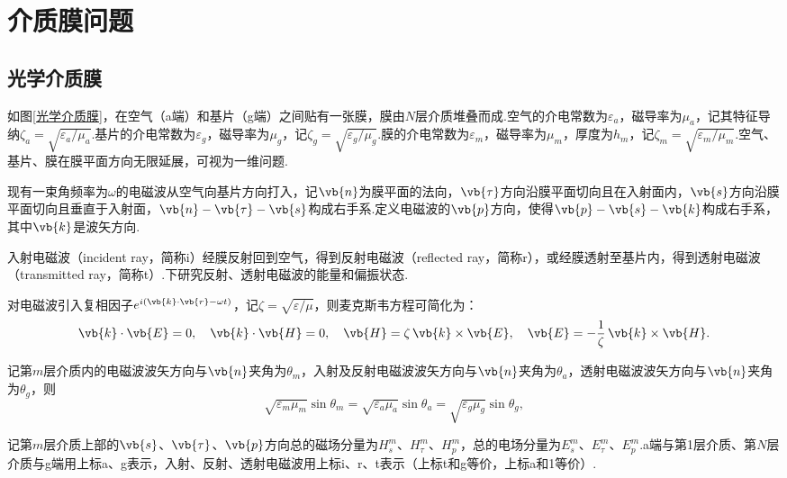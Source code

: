 
\section{介质膜问题}

\subsection{光学介质膜}
如图\ref{光学介质膜}，在空气（a端）和基片（g端）之间贴有一张膜，膜由\(N\)层介质堆叠而成.空气的介电常数为\(\varepsilon_a\)，磁导率为\(\mu_a\)，记其特征导纳\(\zeta_a = \sqrt{\varepsilon_a/\mu_a}\).基片的介电常数为\(\varepsilon_g\)，磁导率为\(\mu_g\)，记\(\zeta_g = \sqrt{\varepsilon_g/\mu_g}\).膜的介电常数为\(\varepsilon_m\)，磁导率为\(\mu_m\)，厚度为\(h_m\)，记\(\zeta_m = \sqrt{\varepsilon_m/\mu_m}\).空气、基片、膜在膜平面方向无限延展，可视为一维问题.

现有一束角频率为\(\omega\)的电磁波从空气向基片方向打入，记\(\vb{n}\)为膜平面的法向，\(\vb{\tau}\)方向沿膜平面切向且在入射面内，\(\vb{s}\)方向沿膜平面切向且垂直于入射面，\(\vb{n}-\vb{\tau}-\vb{s}\)构成右手系.定义电磁波的\(\vb{p}\)方向，使得\(\vb{p}-\vb{s}-\vb{k}\)构成右手系，其中\(\vb{k}\)是波矢方向.

入射电磁波（incident ray，简称i）经膜反射回到空气，得到反射电磁波（reflected ray，简称r），或经膜透射至基片内，得到透射电磁波（transmitted ray，简称t）.下研究反射、透射电磁波的能量和偏振状态.

对电磁波引入复相因子\(e^{i(\vb{k}\cdot\vb{r}-\omega t)}\)，记\(\zeta = \sqrt{\varepsilon/\mu}\)，则麦克斯韦方程可简化为：
\begin{equation*}
	\vb{k}\cdot\vb{E} = 0,\quad \vb{k}\cdot\vb{H} = 0,\quad \vb{H} = \zeta\,\vb{k}\times\vb{E},\quad \vb{E} = -\dfrac{1}{\zeta}\,\vb{k}\times\vb{H}.
\end{equation*}

记第\(m\)层介质内的电磁波波矢方向与\(\vb{n}\)夹角为\(\theta_m\)，入射及反射电磁波波矢方向与\(\vb{n}\)夹角为\(\theta_a\)，透射电磁波波矢方向与\(\vb{n}\)夹角为\(\theta_g\)，则
\begin{equation*}
	\sqrt{\varepsilon_m\mu_m}\sin\theta_m = \sqrt{\varepsilon_a\mu_a}\sin\theta_a = \sqrt{\varepsilon_g\mu_g}\sin\theta_g,
\end{equation*}

记第\(m\)层介质上部的\(\vb{s}\)、\(\vb{\tau}\)、\(\vb{p}\)方向总的磁场分量为\(H_s^m\)、\(H_\tau^m\)、\(H_p^m\)，总的电场分量为\(E_s^m\)、\(E_\tau^m\)、\(E_p^m\).a端与第1层介质、第\(N\)层介质与g端用上标a、g表示，入射、反射、透射电磁波用上标i、r、t表示（上标t和g等价，上标a和1等价）.

